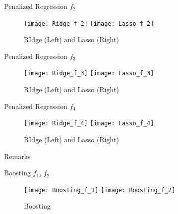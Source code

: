\documentclass[
  ignorenonframetext,
]{beamer}
\begin{document}
\begin{frame}{Penalized Regression \(f_2\)}
\protect\hypertarget{penalized-regression-f_2}{}
\begin{figure}

{\centering \texttt{[image: Ridge\_f\_2]} \texttt{[image: Lasso\_f\_2]} 

}

\caption{RIdge (Left) and Lasso (Right)}\label{fig:penalized-2}
\end{figure}
\end{frame}

\begin{frame}{Penalized Regression \(f_3\)}
\protect\hypertarget{penalized-regression-f_3}{}
\begin{figure}

{\centering \texttt{[image: Ridge\_f\_3]} \texttt{[image: Lasso\_f\_3]} 

}

\caption{RIdge (Left) and Lasso (Right)}\label{fig:penalized-3}
\end{figure}
\end{frame}

\begin{frame}{Penalized Regression \(f_4\)}
\protect\hypertarget{penalized-regression-f_4}{}
\begin{figure}

{\centering \texttt{[image: Ridge\_f\_4]} \texttt{[image: Lasso\_f\_4]} 

}

\caption{RIdge (Left) and Lasso (Right)}\label{fig:penalized-4}
\end{figure}
\end{frame}

\begin{frame}{Remarks}
\protect\hypertarget{remarks-1}{}
\end{frame}

\begin{frame}{Boosting \(f_1\), \(f_2\)}
\protect\hypertarget{boosting-f_1-f_2}{}
\begin{figure}

{\centering \texttt{[image: Boosting\_f\_1]} \texttt{[image: Boosting\_f\_2]} 

}

\caption{Boosting}\label{fig:boosting-1}
\end{figure}
\end{frame}
\end{document}

